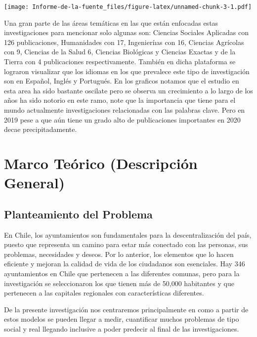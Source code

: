 \documentclass[
  british,
]{article}
\begin{document}
\texttt{[image: Informe-de-la-fuente\_files/figure-latex/unnamed-chunk-3-1.pdf]}

Una gran parte de las áreas temáticas en las que están enfocadas estas
investigaciones para mencionar solo algunas son: Ciencias Sociales
Aplicadas con 126 publicaciones, Humanidades con 17, Ingenieríıas con
16, Ciencias Agrícolas con 9, Ciencias de la Salud 6, Ciencias
Biológicas y Ciencias Exactas y de la Tierra con 4 publicaciones
respectivamente. También en dicha plataforma se lograron visualizar que
los idiomas en los que prevalece este tipo de investigación son en
Español, Inglés y Portugués. En los graficos notamos que el estudio en
esta area ha sido bastante oscilate pero se observa un crecimiento a lo
largo de los años ha sido notorio en este ramo, note que la importancia
que tiene para el mundo actualmente investigaciones relacionadas con las
palabras clave. Pero en 2019 pese a que aún tiene un grado alto de
publicaciones importantes en 2020 decae precipitadamente.

\hypertarget{marco-teuxf3rico-descripciuxf3n-general}{%
\section{Marco Teórico (Descripción
General)}\label{marco-teuxf3rico-descripciuxf3n-general}}

\hypertarget{planteamiento-del-problema}{%
\subsection{Planteamiento del
Problema}\label{planteamiento-del-problema}}

En Chile, los ayuntamientos son fundamentales para la descentralización
del país, puesto que representa un camino para estar más conectado con
las personas, sus problemas, necesidades y deseos. Por lo anterior, los
elementos que lo hacen eficiente y mejoran la calidad de vida de los
ciudadanos son esenciales. Hay 346 ayuntamientos en Chile que pertenecen
a las diferentes comunas, pero para la investigación se seleccionaron
los que tienen más de 50,000 habitantes y que pertenecen a las capitales
regionales con características diferentes.

De la presente investigación nos centraremos principalmente en como a
partir de estos modelos se pueden llegar a medir, cuantificar muchos
problemas de tipo social y real llegando inclusive a poder predecir al
final de las investigaciones.
\end{document}
